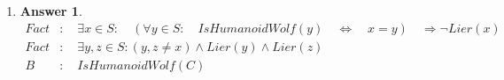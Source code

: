 \documentclass[a4paper]{article}
\renewcommand{\(}{\left(}
\renewcommand{\)}{\right)}
\theoremstyle{plain}
\theoremstyle{plain}
\theoremstyle{definition}
\newtheorem*{answer}{Answer}
\begin{document}
\begin{enumerate}[label*=\alph*.,ref=\alph*]
\item \quad
\begin{shaded}
\begin{answer}
\begin{align*}
 Fact &: \quad \exists x \in S : \quad (\forall y \in S : \quad IsHumanoidWolf(y) \quad \Leftrightarrow \quad x = y) \quad \Rightarrow \neg Lier(x) \\
 Fact &: \quad \exists y , z \in S : (y , z \neq x ) \wedge Lier(y) \wedge Lier(z) \\
 B &: \quad IsHumanoidWolf(C)
\end{align*}
\end{answer}
\end{shaded}

\end{enumerate}
\end{document}
